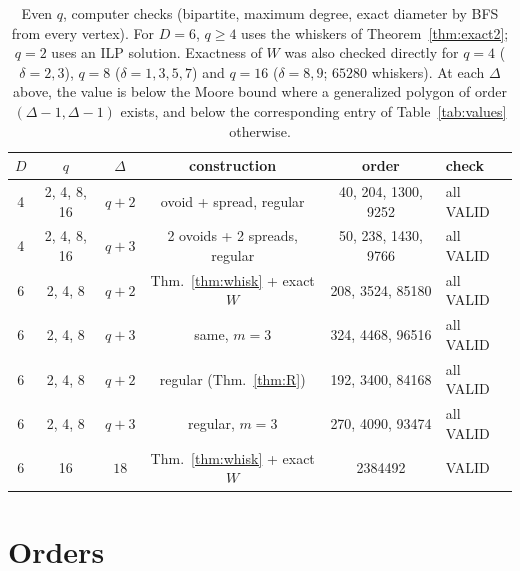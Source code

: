 \documentclass[11pt]{amsart}
\theoremstyle{definition}
\theoremstyle{remark}
\begin{document}
\begin{table}[ht]
\centering
\begin{tabular}{@{}cccccl@{}}
\toprule
$D$ & $q$ & $\Delta$ & construction & order & check \\
\midrule
4 & 2, 4, 8, 16 & $q+2$ & ovoid + spread, regular & 40, 204, 1300, 9252 & all VALID \\
4 & 2, 4, 8, 16 & $q+3$ & 2 ovoids + 2 spreads, regular & 50, 238, 1430, 9766 & all VALID \\
6 & 2, 4, 8 & $q+2$ & Thm.~\ref{thm:whisk} + exact $W$ & 208, 3524, 85180 & all VALID \\
6 & 2, 4, 8 & $q+3$ & same, $m=3$ & 324, 4468, 96516 & all VALID \\
6 & 2, 4, 8 & $q+2$ & regular (Thm.~\ref{thm:R}) & 192, 3400, 84168 & all VALID \\
6 & 2, 4, 8 & $q+3$ & regular, $m=3$ & 270, 4090, 93474 & all VALID \\
6 & 16 & $18$ & Thm.~\ref{thm:whisk} + exact $W$ & 2384492 & VALID \\
\bottomrule
\end{tabular}
\caption{Even $q$, computer checks (bipartite, maximum degree, exact diameter by BFS from every vertex). For $D=6$, $q\ge4$ uses the whiskers of Theorem~\ref{thm:exact2}; $q=2$ uses an ILP solution. Exactness of $W$ was also checked directly for $q=4$ ($\delta=2,3$), $q=8$ ($\delta=1,3,5,7$) and $q=16$ ($\delta=8,9$; $65280$ whiskers). At each $\Delta$ above, the value is below the Moore bound where a generalized polygon of order $(\Delta-1,\Delta-1)$ exists, and below the corresponding entry of Table~\ref{tab:values} otherwise.}\label{tab:even}
\end{table}

\section{Orders}\label{sec:orders}
\end{document}
